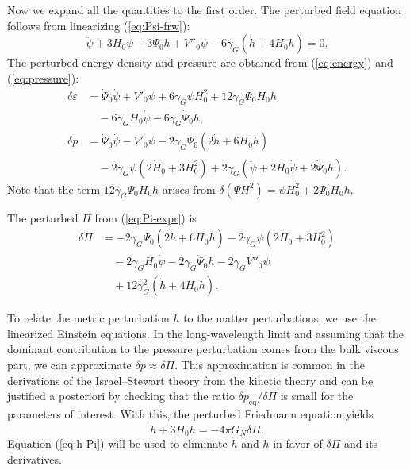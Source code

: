 \documentclass[aps,prd,reprint,superscriptaddress,floatfix]{revtex4-2}
\begin{document}
Now we expand all the quantities to the first order. The perturbed field equation follows from linearizing (\ref{eq:Psi-frw}):
\begin{equation}
\ddot\psi + 3H_0\dot\psi + 3\dot\Psi_0 h + V''_0 \psi - 6\gamma_G(\dot h + 4H_0 h) = 0.
\label{eq:pert-eom}
\end{equation}
The perturbed energy density and pressure are obtained from (\ref{eq:energy}) and (\ref{eq:pressure}):
\begin{align}
\delta\varepsilon &= \dot\Psi_0 \dot\psi + V'_0 \psi + 6\gamma_G\psi H_0^2 + 12\gamma_G\Psi_0 H_0 h \nonumber \\
&\quad - 6\gamma_G H_0 \dot\psi - 6\gamma_G \dot\Psi_0 h, \label{eq:pert-energy}\\
\delta p &= \dot\Psi_0 \dot\psi - V'_0 \psi - 2\gamma_G\Psi_0(2\dot h + 6H_0 h) \nonumber \\
&\quad - 2\gamma_G\psi(2\dot H_0 + 3H_0^2) + 2\gamma_G(\ddot\psi + 2H_0 \dot\psi + 2\dot\Psi_0 h).
\label{eq:pert-pressure}
\end{align}
Note that the term $12\gamma_G\Psi_0 H_0 h$ arises from $\delta(\Psi H^2) = \psi H_0^2 + 2\Psi_0 H_0 h$.

The perturbed $\Pi$ from (\ref{eq:Pi-expr}) is
\begin{align}
\delta \Pi &= -2\gamma_G\Psi_0(2\dot h + 6H_0 h) - 2\gamma_G\psi(2\dot H_0 + 3H_0^2) \nonumber\\
&\quad - 2\gamma_G H_0 \dot\psi - 2\gamma_G \dot\Psi_0 h - 2\gamma_G V''_0 \psi \nonumber\\
&\quad + 12\gamma_G^2(\dot h + 4H_0 h).
\label{eq:pert-Pi}
\end{align}

To relate the metric perturbation $h$ to the matter perturbations, we use the linearized Einstein equations. In the long-wavelength limit and assuming that the dominant contribution to the pressure perturbation comes from the bulk viscous part, we can approximate $\delta p \approx \delta \Pi$. This approximation is common in the derivations of the Israel--Stewart theory from the kinetic theory \cite{Maartens} and can be justified a posteriori by checking that the ratio $\delta p_{\mathrm{eq}}/\delta\Pi$ is small for the parameters of interest. With this, the perturbed Friedmann equation yields
\begin{equation}
\dot h + 3H_0 h = -4\pi G_N \delta \Pi.
\label{eq:h-Pi}
\end{equation}
Equation (\ref{eq:h-Pi}) will be used to eliminate $\dot h$ and $h$ in favor of $\delta\Pi$ and its derivatives.
\end{document}
